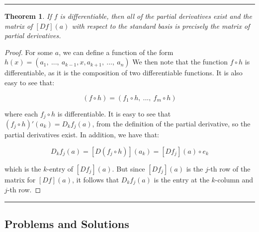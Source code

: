 \documentclass[10pt, oneside]{amsart}
\newcommand{\hl}{\vspace{4pt} \hrule \vspace{4pt}}
\newtheorem{thm}{Theorem}
\begin{document}
    \hl

    \begin{thm}
      If $f$ is differentiable, then all of the partial derivatives exist and the matrix of $[Df](a)$ with respect to the standard basis is precisely the matrix of partial derivatives.
    \end{thm}

    \begin{proof}
      For some $a$, we can define a function of the form $h(x) = (a_1, \ ..., \ a_{k - 1}, x, a_{k + 1}, \ ..., \ a_n)$ We then note that the function $f \circ h$ is differentiable,
      as it is the composition of two differentiable functions. It is also easy to see that:

      $$(f \circ h) = (f_1 \circ h, \ ..., \ f_m \circ h)$$

      where each $f_j \circ h$ is differentiable. It is easy to see that $(f_j \circ h)'(a_k) = D_k f_j(a)$, from the definition of the partial derivative, so the partial derivatives exist. In addition, we have that:

      $$D_k f_j(a) = [D (f_j \circ h)](a_k) = [D f_j](a) \circ e_k$$

      which is the $k$-entry of $[D f_j](a)$. But since $[D f_j](a)$ is the $j$-th row of the matrix for $[Df](a)$, it follows that $D_k f_j(a)$ is the entry at the $k$-column and $j$-th row.
    \end{proof}

    \hl

    \subsection{Problems and Solutions}



    
\end{document}
